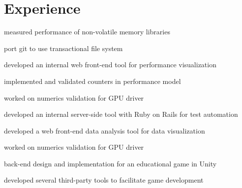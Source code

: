 \documentclass[]{deedy-resume-openfont}
\begin{document}
\hfill
\begin{minipage}[t]{0.66\textwidth}


\section{Experience}

\vspace{\topsep} %
\begin{tightemize}
\item measured performance of non-volatile memory libraries
\item port git to use transactional file system
\end{tightemize}
\sectionsep

\begin{tightemize}
\item developed an internal web front-end tool for performance visualization
\item implemented and validated counters in performance model
\item worked on numerics validation for GPU driver
\end{tightemize}
\sectionsep

\begin{tightemize}
\item developed an internal server-side tool with Ruby on Rails for test automation
\item developed a web front-end data analysis tool for data visualization
\item worked on numerics validation for GPU driver
\end{tightemize}
\sectionsep

\begin{tightemize}
\item back-end design and implementation for an educational game in Unity
\item developed several third-party tools to facilitate game development
\end{tightemize}
\sectionsep


\end{minipage}
\end{document}
